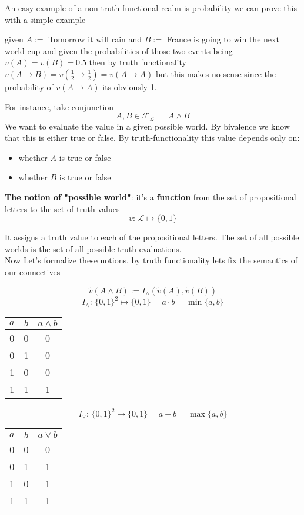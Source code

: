 	An easy example of a non truth-functional realm is probability we can prove this with a simple example

	\begin{example}
	  given $A :=$ Tomorrow it will rain and $B :=$ France is going to win the next world cup and given the probabilities of those two events being $v(A) = v(B) = 0.5$ then by truth functionality $v(A \rightarrow B) = v(\frac{1}{2} \rightarrow \frac{1}{2}) = v(A \rightarrow A)$ but this makes no sense since the probability of $v(A \rightarrow A)$ its obviously 1.
	\end{example}

	For instance, take conjunction
	$$ A, B \in \mathcal{F}_{\mathcal{L}} \;\;\;\;\;\; A \wedge B$$
	We want to evaluate the value in a given possible world.
	By bivalence we know that this is either true or false. By truth-functionality this value depends only on:
	\begin{itemize}
		\item whether $A$ is true or false
		\item whether $B$ is true or false
	\end{itemize}

	\textbf{The notion of "possible world"}: it's a \textbf{function} from the set of propositional letters to the set of truth values
	$$ v: \, \mathcal{L} \mapsto \{0,1\} $$

	It assigns a truth value to each of the propositional letters. The set of all possible worlds is the set of all possible truth evaluations.\\

	Now Let's formalize these notions, by truth functionality lets fix the semantics of our connectives

	$$ \tilde{v}(A \wedge B) := I_\wedge (\tilde{v}(A),  \tilde{v}(B))$$
	$$ I_{\wedge} : \, \{0,1\}^2 \mapsto \{0,1\}  = a \cdot b = \min \{a,b\} $$
	\begin{center}
		\begin{tabular}{c c | c}
			$a$ & $b$ & $a \wedge b$ \\
			\hline
			0 & 0 & 0 \\
			0 & 1 & 0 \\
			1 & 0 & 0 \\
			1 & 1 & 1
		\end{tabular}
	\end{center}

	$$ I_{\vee} : \, \{0,1\}^2 \mapsto \{0,1\} = a + b = \max \{a,b\} $$
	\begin{center}
		\begin{tabular}{c c | c}
			$a$ & $b$ & $a \vee b$ \\
			\hline
			0 & 0 & 0 \\
			0 & 1 & 1 \\
			1 & 0 & 1 \\
			1 & 1 & 1
		\end{tabular}
	\end{center}


